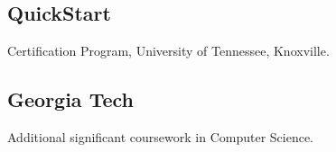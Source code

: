 \documentclass[]{plushcv}
\begin{document}
\begin{paracol}{2}
\subsection{QuickStart}
Certification Program, University of Tennessee, Knoxville. \\

\sectionsep
\subsection{Georgia Tech}
Additional significant coursework in Computer Science. \\
\sectionsep







\end{paracol}
\end{document}
